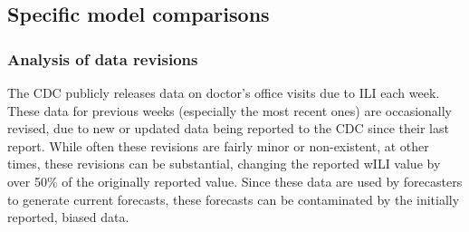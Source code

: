 \documentclass{article}\usepackage[]{graphicx}\usepackage[]{color}
\begin{document}
% 


\subsection{Specific model comparisons}\label{sec:delay-model}

\subsubsection*{Analysis of data revisions}

The CDC publicly releases data on doctor's office visits due to ILI each week. 
These data for previous weeks (especially the most recent ones) are occasionally revised, due to new or updated data being reported to the CDC since their last report.
While often these revisions are fairly minor or non-existent, at other times, these revisions can be substantial, changing the reported wILI value by over 50\% of the originally reported value.
Since these data are used by forecasters to generate current forecasts, these forecasts can be contaminated by the initially reported, biased data.
\end{document}
